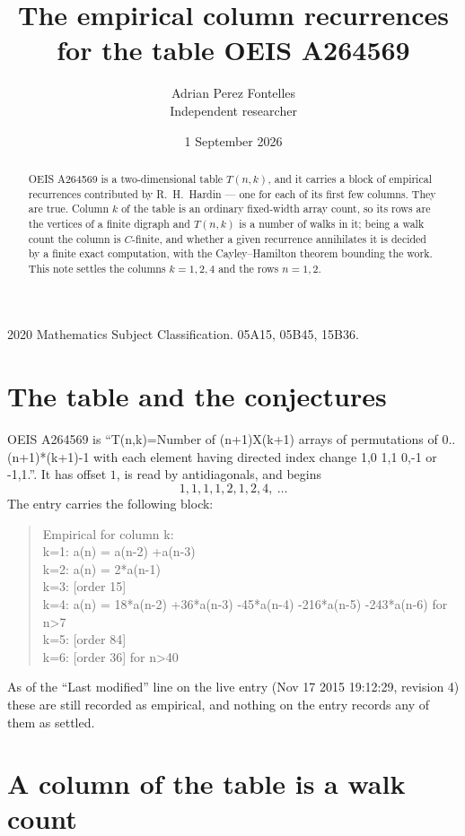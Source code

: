 \documentclass[11pt,a4paper]{article}
\title{The empirical column recurrences for the table OEIS A264569}
\author{Adrian Perez Fontelles\\ \small Independent researcher}
\date{1 September 2026}
\theoremstyle{plain}
\theoremstyle{definition}
\begin{document}
\maketitle

\begin{abstract}
OEIS A264569 is a two-dimensional table $T(n,k)$, and it carries a block of empirical
recurrences contributed by R.~H.~Hardin --- one for each of its first few columns. They are
true. Column $k$ of the table is an ordinary fixed-width array count, so its rows are the
vertices of a finite digraph and $T(n,k)$ is a number of walks in it; being a walk count the
column is $C$-finite, and whether a given recurrence annihilates it is decided by a finite
exact computation, with the Cayley--Hamilton theorem bounding the work. This note settles the columns $k=1, 2, 4$ and the rows $n=1, 2$.
\end{abstract}

\noindent\small 2020 Mathematics Subject Classification. 05A15, 05B45, 15B36.\normalsize

\section{The table and the conjectures}

OEIS A264569 is ``T(n,k)=Number of (n+1)X(k+1) arrays of permutations of 0..(n+1)*(k+1)-1 with each element having directed index change 1,0 1,1 0,-1 or -1,1.''. It has offset $1$, is
read by antidiagonals, and begins
\[
1, 1, 1, 1, 2, 1, 2, 4,\ \dots
\]
The entry carries the following block:
\begin{quote}\small
Empirical for column k:\\
k=1: a(n) = a(n-2) +a(n-3)\\
k=2: a(n) = 2*a(n-1)\\
k=3: [order 15]\\
k=4: a(n) = 18*a(n-2) +36*a(n-3) -45*a(n-4) -216*a(n-5) -243*a(n-6) for n>7\\
k=5: [order 84]\\
k=6: [order 36] for n>40\\
\end{quote}
As of the ``Last modified'' line on the live entry (Nov 17 2015 19:12:29, revision 4) these are still
recorded as empirical, and nothing on the entry records any of them as settled.

\section{A column of the table is a walk count}
\end{document}
